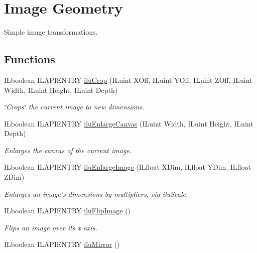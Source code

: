 \hypertarget{group__ilu__geometry}{\section{Image Geometry}
\label{group__ilu__geometry}
}


Simple image transformations.  


\subsection*{Functions}
\begin{DoxyCompactItemize}
\item 
I\+Lboolean I\+L\+A\+P\+I\+E\+N\+T\+R\+Y \hyperlink{group__ilu__geometry_ga80e4330e84ad8ec34c701e9b72c1ffed}{ilu\+Crop} (I\+Luint X\+Off, I\+Luint Y\+Off, I\+Luint Z\+Off, I\+Luint Width, I\+Luint Height, I\+Luint Depth)
\begin{DoxyCompactList}\small\item\em \char`\"{}\+Crops\char`\"{} the current image to new dimensions. \end{DoxyCompactList}\item 
I\+Lboolean I\+L\+A\+P\+I\+E\+N\+T\+R\+Y \hyperlink{group__ilu__geometry_gacba148d63e2e0da80b100c3ada950cb4}{ilu\+Enlarge\+Canvas} (I\+Luint Width, I\+Luint Height, I\+Luint Depth)
\begin{DoxyCompactList}\small\item\em Enlarges the canvas of the current image. \end{DoxyCompactList}\item 
I\+Lboolean I\+L\+A\+P\+I\+E\+N\+T\+R\+Y \hyperlink{group__ilu__geometry_gaa9fe272b82b15ed2e52762e5e763b908}{ilu\+Enlarge\+Image} (I\+Lfloat X\+Dim, I\+Lfloat Y\+Dim, I\+Lfloat Z\+Dim)
\begin{DoxyCompactList}\small\item\em Enlarges an image's dimensions by multipliers, via ilu\+Scale. \end{DoxyCompactList}\item 
\hypertarget{group__ilu__geometry_ga102b4491bacd9ac35795351150f6afa1}{I\+Lboolean I\+L\+A\+P\+I\+E\+N\+T\+R\+Y \hyperlink{group__ilu__geometry_ga102b4491bacd9ac35795351150f6afa1}{ilu\+Flip\+Image} ()}\label{group__ilu__geometry_ga102b4491bacd9ac35795351150f6afa1}

\begin{DoxyCompactList}\small\item\em Flips an image over its x axis. \end{DoxyCompactList}\item 
\hypertarget{group__ilu__geometry_ga34ba55cb258ff33ab1e987a893a83c3c}{I\+Lboolean I\+L\+A\+P\+I\+E\+N\+T\+R\+Y \hyperlink{group__ilu__geometry_ga34ba55cb258ff33ab1e987a893a83c3c}{ilu\+Mirror} ()}\label{group__ilu__geometry_ga34ba55cb258ff33ab1e987a893a83c3c}


\end{DoxyCompactItemize}
